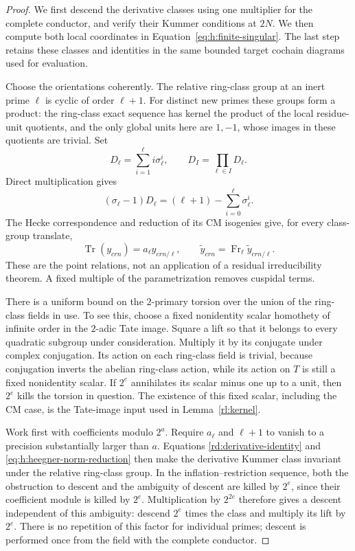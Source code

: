 \begin{proof}
We first descend the derivative classes using one multiplier for the
complete conductor, and verify their Kummer conditions at $2N$. We then
compute both local coordinates in Equation~\eqref{eq:h:finite-singular}.
The last step retains these classes and identities in the same bounded
target cochain diagrams used for evaluation.

Choose the orientations coherently.  The relative ring-class group at
an inert prime \(\ell\) is cyclic of order \(\ell+1\).  For distinct new
primes these groups form a product: the ring-class exact sequence has
kernel the product of the local residue-unit quotients, and the only
global units here are \(1,-1\), whose images in these quotients are
trivial.  Set
\[
 D_\ell=\sum_{i=1}^{\ell} i\sigma_\ell^i,\qquad
 D_I=\prod_{\ell\in I}D_\ell.
\]
Direct multiplication gives
\begin{equation}
 (\sigma_\ell-1)D_\ell=(\ell+1)-
             \sum_{i=0}^{\ell}\sigma_\ell^i.
 \label{rd:derivative-identity}
\end{equation}
The Hecke correspondence and reduction of its CM isogenies give, for
every class-group translate,
\begin{equation}
 \operatorname{Tr}(y_{c r n})=a_\ell y_{c r n/\ell},
 \qquad
 \widetilde y_{c r n}=\operatorname{Fr}_\ell
                       \widetilde y_{c r n/\ell}.
 \label{eq:h:heegner-norm-reduction}
\end{equation}
These are the point relations, not an application of a residual
irreducibility theorem.  A fixed multiple of the parametrization removes
cuspidal terms.

There is a uniform bound on the \(2\)-primary torsion over the union of
the ring-class fields in use.  To see this, choose a fixed nonidentity
scalar homothety of infinite order in the \(2\)-adic Tate image.
Square a lift so that it
belongs to every quadratic subgroup under consideration.  Multiply it
by its conjugate under complex conjugation.  Its action on each
ring-class field is trivial, because conjugation inverts the abelian
ring-class action, while its action on \(T\) is still a fixed
nonidentity scalar.  If \(2^e\) annihilates its scalar minus one up to
a unit, then \(2^e\) kills the torsion in question.  The existence of
this fixed scalar, including the CM case, is the Tate-image input
used in Lemma~\ref{rl:kernel}.

Work first with coefficients modulo \(2^a\).  Require \(a_\ell\) and
\(\ell+1\) to vanish to a precision substantially larger than \(a\).
Equations \eqref{rd:derivative-identity} and
\eqref{eq:h:heegner-norm-reduction} then make the derivative Kummer class
invariant under the relative ring-class group.  In the
inflation--restriction sequence, both the obstruction to descent and
the ambiguity of descent are killed by \(2^e\), since their
coefficient module is killed by \(2^e\).  Multiplication by \(2^{2e}\)
therefore gives a descent independent of this ambiguity: descend
\(2^e\) times the class and multiply its lift by \(2^e\).
There is no repetition of this factor for individual primes; descent
is performed once from the field with the complete conductor.


\end{proof}
